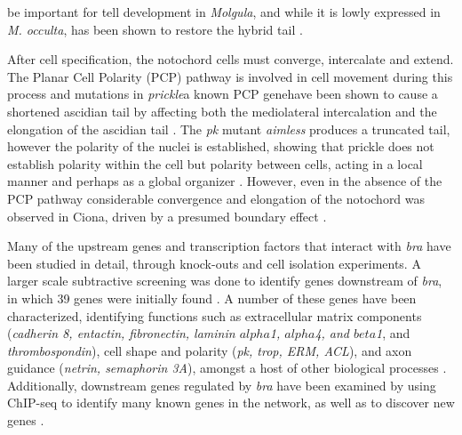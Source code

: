 be important for tell development in \textit{Molgula}, and while it is lowly expressed in \textit{M. occulta}, has been shown to restore the hybrid tail \cite{swalla_requirement_1996, swalla_multigene_1999}. 
  
After cell specification, the notochord cells must converge, intercalate and extend. The Planar Cell Polarity (PCP) pathway is involved in cell movement during this process and mutations in \textit{prickle}\textemdash a known PCP gene\textemdash have been shown to cause a shortened ascidian tail by affecting both the mediolateral intercalation and the elongation of the ascidian tail \cite{jiang_ascidian_2005}. The \textit{pk} mutant \textit{aimless} produces a truncated tail, however the polarity of the nuclei is established, showing that prickle does not establish polarity within the cell but polarity between cells, acting in a local manner and perhaps as a global organizer \cite{jiang_ascidian_2005,kourakis_one-dimensional_2014}. However, even in the absence of the PCP pathway considerable convergence and elongation of the notochord was observed in Ciona, driven by a presumed boundary effect \cite{veeman_chongmague_2008}.

Many of the upstream genes and transcription factors that interact with \textit{bra} have been studied in detail, through knock-outs and cell isolation experiments. A larger scale subtractive screening was done to identify genes downstream of \textit{bra}, in which 39 genes were initially found \cite{hotta_temporal_1999}. A number of these genes have been characterized, identifying functions such as extracellular matrix components (\textit{cadherin 8, entactin, fibronectin, laminin $alpha$1, $alpha$4, and $beta$1}, and {\em thrombospondin}), cell shape and polarity (\textit{pk, trop, ERM, ACL}), and axon guidance (\textit{netrin, semaphorin 3A}), amongst a host of other biological processes \cite{hotta_characterization_2000,hotta_brachyury-downstream_2007,kugler_evolutionary_2008}. Additionally, downstream genes regulated by \textit{bra} have been examined by using ChIP-seq to identify many known genes in the network, as well as to discover new genes \cite{kubo_genomic_2010,katikala_functional_2013}.

